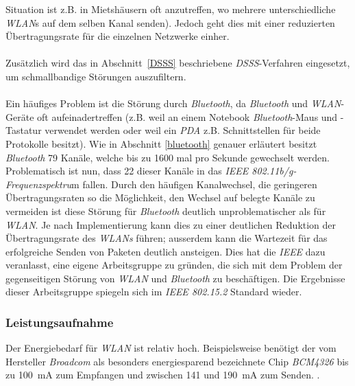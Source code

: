             Situation ist z.B. in Mietshäusern oft anzutreffen, wo mehrere 
            unterschiedliche \emph{WLAN}s auf dem selben Kanal senden). Jedoch geht dies
            mit einer reduzierten Übertragungsrate für die einzelnen Netzwerke
            einher.\\
            \\
            Zusätzlich wird das in Abschnitt~\ref{DSSS} beschriebene \emph{DSSS}-Verfahren
            eingesetzt, um schmallbandige Störungen auszufiltern. \\
            \\
            Ein häufiges Problem ist die Störung durch \emph{Bluetooth}, da 
            \emph{Bluetooth} und \emph{WLAN}-Geräte oft aufeinadertreffen (z.B. weil an einem
            Notebook \emph{Bluetooth}-Maus und -Tastatur verwendet werden oder weil 
            ein \emph{PDA} z.B. Schnittstellen für beide Protokolle besitzt).
            Wie in Abschnitt \ref{bluetooth} genauer erläutert besitzt \emph{Bluetooth}
            79 Kanäle, welche bis zu 1600 mal pro Sekunde gewechselt werden.
            Problematisch ist nun, dass 22 dieser Kanäle in das 
            \emph{IEEE 802.11b/g-Frequenzspektru}m fallen. Durch den häufigen
            Kanalwechsel, die geringeren Übertragungsraten so die 
            Möglichkeit, den Wechsel auf belegte Kanäle zu vermeiden ist diese
            Störung für \emph{Bluetooth} deutlich unproblematischer als für \emph{WLAN}.
            Je nach Implementierung kann dies zu einer deutlichen Reduktion
            der Übertragungsrate des \emph{WLANs} führen; ausserdem kann die Wartezeit
            für das erfolgreiche Senden von Paketen deutlich ansteigen.
            Dies hat die \emph{IEEE} dazu veranlasst, eine eigene Arbeitsgruppe
            zu gründen, die sich mit dem Problem der gegenseitigen Störung
            von \emph{WLAN} und \emph{Bluetooth} zu beschäftigen. Die Ergebnisse dieser
            Arbeitsgruppe spiegeln sich im \emph{IEEE 802.15.2} Standard wieder.

        \subsubsection{Leistungsaufnahme}
            Der Energiebedarf für \emph{WLAN} ist relativ hoch. Beispielsweise benötigt der
            vom Hersteller \emph{Broadcom} als besonders energiesparend bezeichnete Chip
            \emph{BCM4326} bis zu 100~mA zum Empfangen und zwischen 141 und 190~mA zum Senden.
            \cite{BCM4326_Datasheet}. 

